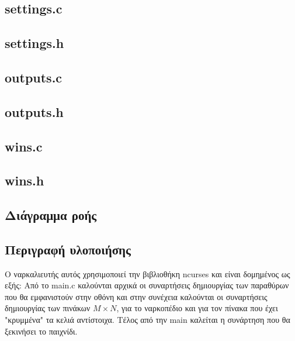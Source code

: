 \documentclass{article}
\begin{document}
    \subsection{settings.c}
        

    \subsection{settings.h}
        

    \subsection{outputs.c}
        

    \subsection{outputs.h}
        

    \subsection{wins.c}
        

    \subsection{wins.h}
        

    \subsection{Διάγραμμα ροής}

    \subsection{Περιγραφή υλοποιήσης}

    Ο ναρκαλιευτής αυτός χρησιμοποιεί την βιβλιοθήκη ncurses και είναι δομημένος ως εξής:
    Από το main.c καλούνται αρχικά οι συναρτήσεις δημιουργίας των παραθύρων που θα εμφανιστούν
    στην οθόνη και στην συνέχεια καλούνται οι συναρτήσεις δημιουργίας των πινάκων $Μ \times N$,
    για το ναρκοπέδιο και για τον πίνακα που έχει "κρυμμένα" τα κελιά αντίστοιχα.
    Τέλος από την main καλείται η συνάρτηση που θα ξεκινήσει το παιχνίδι.  
\end{document}
